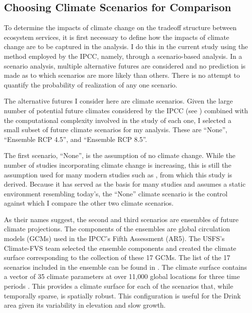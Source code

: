 \subsection{Choosing Climate Scenarios for Comparison}
To determine the impacts of climate change on the tradeoff structure between ecosystem services, it is first necessary to define how the impacts of climate change are to be captured in the analysis. I do this in the current study using the method employed by the IPCC, namely, through a scenario-based analysis. In a scenario analysis, multiple alternative futures are considered and no prediction is made as to which scenarios are more likely than others. There is no attempt to quantify the probability of realization of any one scenario.

The alternative futures I consider here are climate scenarios. Given the large number of potential future climates considered by the IPCC (see \cite{ipccListOfAR5Models}) combined with the computational complexity involved in the study of each one, I selected a small subset of  future climate scenarios for my analysis. These are ``None'', ``Ensemble RCP 4.5'', and ``Ensemble RCP 8.5''.

The first scenario, ``None'', is the assumption of no climate change. While the number of studies incorporating climate change is increasing, this is still the assumption used for many modern studies such as \cite{svetlanaDissertation2013}, from which this study is derived. Because it has served as the basis for many studies and assumes a static environment resembling today's, the ``None'' climate scenario is the control against which I compare the other two climate scenarios.

As their names suggest, the second and third scenarios are ensembles of future climate projections. The components of the ensembles are global circulation models (GCMs) used in the IPCC's Fifth Assessment (AR5). The USFS's Climate-FVS \cite{dixon2002essential} team selected the ensemble components and created the climate surface corresponding to the collection of these 17 GCMs. The list of the 17 scenarios included in the ensemble can be found in \cite{ClimateModelsInFVSEnsemble}. The climate surface contains a vector of 35 climate parameters at over 11,000 global locations for three time periods \cite{crookston2014climate}. This provides a climate surface for each of the scenarios that, while temporally sparse, is spatially robust. This configuration is useful for the Drink area given its variability in elevation and slow growth.


